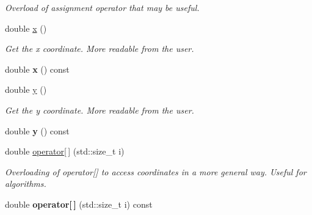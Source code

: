 \begin{DoxyCompactItemize}
\begin{DoxyCompactList}\small\item\em Overload of assignment operator that may be useful. \item\end{DoxyCompactList}\item 
\hypertarget{classpoint2D_a8dccc4851685f94e1f0de5f3b352e30f}{
double \hyperlink{classpoint2D_a8dccc4851685f94e1f0de5f3b352e30f}{x} ()}
\label{classpoint2D_a8dccc4851685f94e1f0de5f3b352e30f}

\begin{DoxyCompactList}\small\item\em Get the x coordinate. More readable from the user. \item\end{DoxyCompactList}\item 
\hypertarget{classpoint2D_a446dd7f78782570f7b85e3ff7d76f3cc}{
double {\bfseries x} () const }
\label{classpoint2D_a446dd7f78782570f7b85e3ff7d76f3cc}

\item 
\hypertarget{classpoint2D_a7345576a9e4adc731eb6a1923e190fa7}{
double \hyperlink{classpoint2D_a7345576a9e4adc731eb6a1923e190fa7}{y} ()}
\label{classpoint2D_a7345576a9e4adc731eb6a1923e190fa7}

\begin{DoxyCompactList}\small\item\em Get the y coordinate. More readable from the user. \item\end{DoxyCompactList}\item 
\hypertarget{classpoint2D_aef13de09fb8ce9b25ec719a74a880fb5}{
double {\bfseries y} () const }
\label{classpoint2D_aef13de09fb8ce9b25ec719a74a880fb5}

\item 
\hypertarget{classpoint2D_acbf4f8b1fe57e103a877234b6975b907}{
double \hyperlink{classpoint2D_acbf4f8b1fe57e103a877234b6975b907}{operator\mbox{[}$\,$\mbox{]}} (std::size\_\-t i)}
\label{classpoint2D_acbf4f8b1fe57e103a877234b6975b907}

\begin{DoxyCompactList}\small\item\em Overloading of operator\mbox{[}\mbox{]} to access coordinates in a more general way. Useful for algorithms. \item\end{DoxyCompactList}\item 
\hypertarget{classpoint2D_aa192986ed60b1dd250967cd84d59be20}{
double {\bfseries operator\mbox{[}$\,$\mbox{]}} (std::size\_\-t i) const }
\label{classpoint2D_aa192986ed60b1dd250967cd84d59be20}


\end{DoxyCompactItemize}
